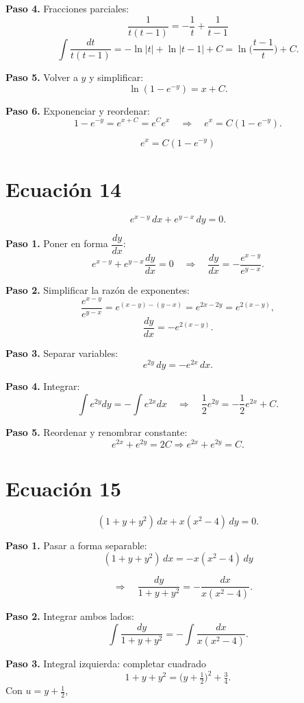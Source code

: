\documentclass[12pt,a4paper]{article}
\begin{document}
\begin{multicols}{2}
	\textbf{Paso 4.} Fracciones parciales:
	\[
	\frac{1}{t(t-1)}=-\frac{1}{t}+\frac{1}{t-1}
	\]
	\[
	\int\frac{dt}{t(t-1)}=-\ln|t|+\ln|t-1|+C=\ln\!\Big(\frac{t-1}{t}\Big)+C.
	\]
	
	\textbf{Paso 5.} Volver a \(y\) y simplificar:
	\[
	\ln(1-e^{-y})=x+C.
	\]
	
	\textbf{Paso 6.} Exponenciar y reordenar:
	\[
	1-e^{-y}=e^{x+C}=e^{C}e^{x}\quad\Rightarrow\quad e^{x}=C(1-e^{-y}).
	\]
	
	\[
	\boxed{e^{x}=C(1-e^{-y})}
	\]
	
	\section*{Ecuación 14}
	\[
	e^{x-y}\,dx+e^{y-x}\,dy=0.
	\]
	
	\textbf{Paso 1.} Poner en forma \(\dfrac{dy}{dx}\):
	\[
	e^{x-y}+e^{y-x}\frac{dy}{dx}=0
	\quad\Rightarrow\quad
	\frac{dy}{dx}=-\frac{e^{x-y}}{e^{y-x}}.
	\]
	
	\textbf{Paso 2.} Simplificar la razón de exponentes:
	\[
	\frac{e^{x-y}}{e^{y-x}}=e^{(x-y)-(y-x)}=e^{2x-2y}=e^{2(x-y)},
	\]
	\[
	\frac{dy}{dx}=-e^{2(x-y)}.
	\]
	
	\textbf{Paso 3.} Separar variables:
	\[
	e^{2y}\,dy=-e^{2x}\,dx.
	\]
	
	\textbf{Paso 4.} Integrar:
	\[
	\int e^{2y}dy=-\int e^{2x}dx
	\quad\Rightarrow\quad
	\frac{1}{2}e^{2y}=-\frac{1}{2}e^{2x}+C.
	\]
	
	\textbf{Paso 5.} Reordenar y renombrar constante:
	\[
	e^{2x}+e^{2y}=2C \Rightarrow \boxed{e^{2x}+e^{2y}=C.}
	\]
	
	\section*{Ecuación 15}
	\[
	(1+y+y^{2})\,dx + x(x^{2}-4)\,dy = 0.
	\]
	
	\textbf{Paso 1.} Pasar a forma separable:
	\[
	(1+y+y^{2})\,dx = -x(x^{2}-4)\,dy
	\]

  \[
	\quad\Rightarrow\quad
	\frac{dy}{1+y+y^{2}} = -\frac{dx}{x(x^{2}-4)}.\]
	
	\textbf{Paso 2.} Integrar ambos lados:
	\[
	\int\frac{dy}{1+y+y^{2}} = -\int\frac{dx}{x(x^{2}-4)}.
	\]
	
	\textbf{Paso 3.} Integral izquierda: completar cuadrado
	\[
	1+y+y^{2}=\Big(y+\tfrac{1}{2}\Big)^{2}+\tfrac{3}{4}.
	\]
	Con \(u=y+\tfrac{1}{2}\),
	

\end{multicols}
\end{document}
